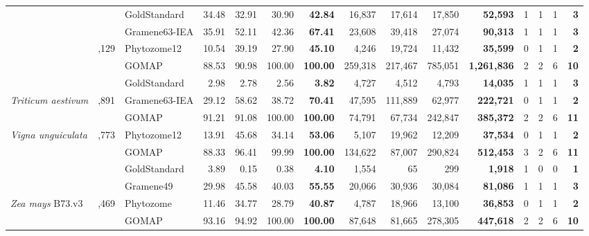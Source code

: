 \documentclass[utf8]{frontiersSCNS}
\begin{document}
\begin{table}[t]
{\begin{threeparttable}
\begin{tabular}{lrlrrr>{\bfseries}r|rrr>{\bfseries}r|rrr>{\bfseries}r}
\rowcolor{gray!6}   &  & GoldStandard & 34.48 & 32.91 & 30.90 & 42.84 & 16,837 & 17,614 & 17,850 & 52,593 & 1 & 1 & 1 & 3\\

 &  & Gramene63-IEA & 35.91 & 52.11 & 42.36 & 67.41 & 23,608 & 39,418 & 27,074 & 90,313 & 1 & 1 & 1 & 3\\

\rowcolor{gray!6}  \multirow{-4}{*}{\raggedright\arraybackslash \textit{Sorghum bicolor}} & \multirow{-4}{*}{\raggedleft\arraybackslash 34,129} & Phytozome12 & 10.54 & 39.19 & 27.90 & 45.10 & 4,246 & 19,724 & 11,432 & 35,599 & 0 & 1 & 1 & 2\\
\cmidrule{1-15}
 &  & GOMAP & 88.53 & 90.98 & 100.00 & 100.00 & 259,318 & 217,467 & 785,051 & 1,261,836 & 2 & 2 & 6 & 10\\

\rowcolor{gray!6}   &  & GoldStandard & 2.98 & 2.78 & 2.56 & 3.82 & 4,727 & 4,512 & 4,793 & 14,035 & 1 & 1 & 1 & 3\\

\multirow{-3}{*}{\raggedright\arraybackslash \textit{Triticum aestivum}} & \multirow{-3}{*}{\raggedleft\arraybackslash 107,891} & Gramene63-IEA & 29.12 & 58.62 & 38.72 & 70.41 & 47,595 & 111,889 & 62,977 & 222,721 & 0 & 1 & 1 & 2\\
\cmidrule{1-15}
\rowcolor{gray!6}   &  & GOMAP & 91.21 & 91.08 & 100.00 & 100.00 & 74,791 & 67,734 & 242,847 & 385,372 & 2 & 2 & 6 & 11\\

\multirow{-2}{*}{\raggedright\arraybackslash \textit{Vigna unguiculata}} & \multirow{-2}{*}{\raggedleft\arraybackslash 29,773} & Phytozome12 & 13.91 & 45.68 & 34.14 & 53.06 & 5,107 & 19,962 & 12,209 & 37,534 & 0 & 1 & 1 & 2\\
\cmidrule{1-15}
\rowcolor{gray!6}   &  & GOMAP & 88.33 & 96.41 & 99.99 & 100.00 & 134,622 & 87,007 & 290,824 & 512,453 & 3 & 2 & 6 & 11\\

 &  & GoldStandard & 3.89 & 0.15 & 0.38 & 4.10 & 1,554 & 65 & 299 & 1,918 & 1 & 0 & 0 & 1\\

\rowcolor{gray!6}   &  & Gramene49 & 29.98 & 45.58 & 40.03 & 55.55 & 20,066 & 30,936 & 30,084 & 81,086 & 1 & 1 & 1 & 3\\

\multirow{-4}{*}{\raggedright\arraybackslash \textit{Zea mays} B73.v3} & \multirow{-4}{*}{\raggedleft\arraybackslash 39,469} & Phytozome & 11.46 & 34.77 & 28.79 & 40.87 & 4,787 & 18,966 & 13,100 & 36,853 & 0 & 1 & 1 & 2\\
\cmidrule{1-15}
\rowcolor{gray!6}   &  & GOMAP & 93.16 & 94.92 & 100.00 & 100.00 & 87,648 & 81,665 & 278,305 & 447,618 & 2 & 2 & 6 & 10\\


\end{tabular}
\end{threeparttable}}
\end{table}
\end{document}
